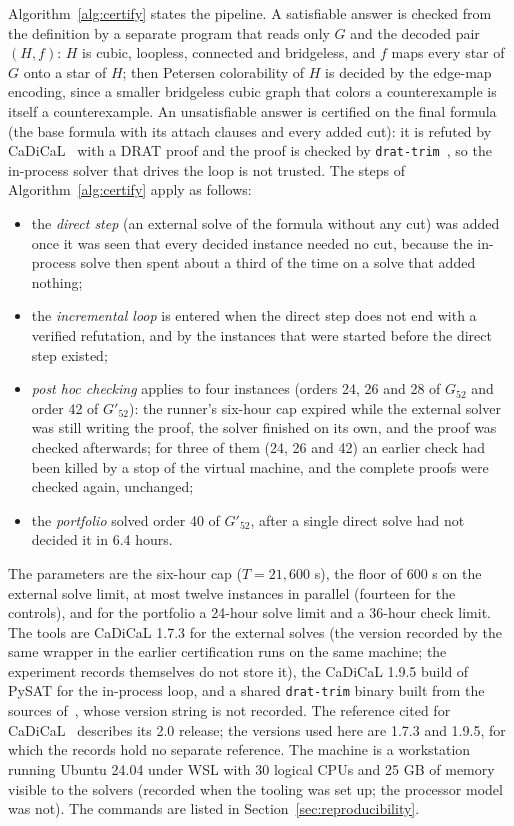 \documentclass[11pt]{article}
\theoremstyle{definition}
\theoremstyle{remark}
\newcommand{\Ga}{G_{52}}
\newcommand{\Gb}{G'_{52}}
\begin{document}
Algorithm~\ref{alg:certify} states the pipeline. A satisfiable answer is checked from the definition by a separate program that reads only $G$ and the decoded pair $(H,f)$: $H$ is cubic, loopless,
connected and bridgeless, and $f$ maps every star of $G$ onto a star of $H$; then Petersen colorability of $H$ is decided by the edge-map encoding, since a smaller bridgeless cubic graph that colors a
counterexample is itself a counterexample. An unsatisfiable answer is certified on the final formula (the base formula with its attach clauses and every added cut): it is refuted by
CaDiCaL~\cite{CaDiCaL} with a DRAT proof and the proof is checked by \texttt{drat-trim}~\cite{DRATtrim}, so the in-process solver that drives the loop is not trusted. The steps of Algorithm~\ref{alg:certify} apply as follows:
\begin{itemize}
\item the \emph{direct step} (an external solve of the formula without any cut) was added once it was seen that every decided instance needed no cut, because the in-process solve then spent about a third of
the time on a solve that added nothing;
\item the \emph{incremental loop} is entered when the direct step does not end with a verified refutation, and by the instances that were started before the direct step existed;
\item \emph{post hoc checking} applies to four instances (orders 24, 26 and 28 of $\Ga$ and order 42 of $\Gb$): the runner's six-hour cap expired while the external solver was still writing the proof, the solver finished on its own, and
the proof was checked afterwards; for three of them (24, 26 and 42) an earlier check had been killed by a stop of the virtual machine, and the complete proofs were checked again, unchanged;
\item the \emph{portfolio} solved order 40 of $\Gb$, after a single direct solve had not decided it in 6.4 hours.
\end{itemize}
The parameters are the six-hour cap ($T = 21{,}600$ s), the floor of 600 s on the external solve limit, at most twelve instances in parallel (fourteen for the controls), and for the portfolio a 24-hour
solve limit and a 36-hour check limit. The tools are CaDiCaL 1.7.3 for the external solves (the version recorded by the same wrapper in the earlier certification runs on the same machine; the experiment records
themselves do not store it), the CaDiCaL 1.9.5 build of PySAT for the in-process loop, and a shared \texttt{drat-trim} binary built from the sources of~\cite{DRATtrim}, whose version string is not recorded. The reference cited for CaDiCaL~\cite{CaDiCaL} describes its 2.0 release; the versions used here are 1.7.3 and 1.9.5, for which the records hold no separate reference. The machine is a workstation running Ubuntu 24.04 under WSL with 30 logical CPUs
and 25 GB of memory visible to the solvers (recorded when the tooling was set up; the processor model was not). The commands are listed in Section~\ref{sec:reproducibility}.
\end{document}
